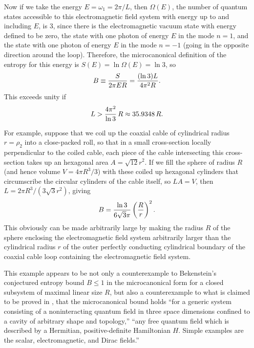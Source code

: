 \documentclass[a4paper,12pt]{article}
\begin{document}
	Now if we take the energy
$E = \omega_1 = 2\pi/L$,
then $\Omega(E)$, the number of quantum states
accessible to this electromagnetic field system
with energy up to and including $E$,
is 3, since there is the electromagnetic vacuum
state with energy defined to be zero,
the state with one photon of energy $E$
in the mode $n=1$,
and the state with one photon of energy $E$
in the mode $n=-1$
(going in the opposite direction around the loop).
Therefore, the microcanonical definition
of the entropy for this energy is
$S(E) = \ln{\Omega(E)} = \ln{3}$, so
 \begin{equation}
 B \equiv {S \over 2 \pi E R} = {(\ln{3}) L \over 4 \pi^2 R}.
 \label{eq:16}
 \end{equation}
This exceeds unity if 
 \begin{equation}
 L > {4 \pi^2 \over \ln{3}} \, R \approx 35.9348 \, R.
 \label{eq:17}
 \end{equation}

	For example, suppose that we coil up
the coaxial cable of cylindrical radius $r=\rho_2$
into a close-packed roll, so that in a small cross-section
locally perpendicular to the coiled cable, each piece of the
cable intersecting this cross-section takes up
an hexagonal area $A = \sqrt{12} r^2$.
If we fill the sphere of radius $R$
(and hence volume $V = 4\pi R^3/3$)
with these coiled up hexagonal cylinders
that circumscribe the circular cylinders
of the cable itself, so $L A = V$,
then $L = 2\pi R^3/(3\sqrt{3}r^2)$, giving
 \begin{equation}
 B = {\ln{3}\over 6\sqrt{3} \pi} \left({R\over r}\right)^2.
 \label{eq:18}
 \end{equation}
This obviously can be made arbitrarily large
by making the radius $R$ of the sphere
enclosing the electromagnetic field system
arbitrarily larger than the cylindrical
radius $r$ of the outer perfectly
conducting cylindrical boundary
of the coaxial cable loop containing the
electromagnetic field system.

	This example appears to be not only
a counterexample to
Bekenstein's conjectured entropy bound
$B \leq 1$
in the microcanonical form 
for a closed subsystem of maximal linear size $R$,
but also a counterexample to what is claimed
to be proved in
\cite{SB1},
that the microcanonical bound holds
``for a generic system consisting of
a noninteracting quantum field
in three space dimensions confined to a cavity
of arbitrary shape and topology,''
``any free quantum field
which is described by a Hermitian,
positive-definite Hamiltonian $H$.
Simple examples are the scalar,
electromagnetic, and Dirac fields.''
\end{document}

